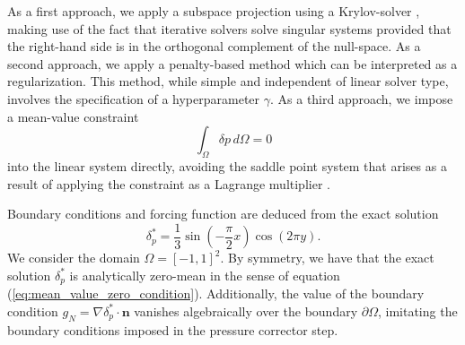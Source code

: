As a first approach, we apply a subspace projection using a Krylov-solver \cite{vorst_iterative_2003}, making use of the fact that iterative solvers solve singular systems provided that the right-hand side is in the orthogonal complement of the null-space.
As a second approach, we apply a penalty-based method which can be interpreted as a regularization.
This method, while simple and independent of linear solver type, involves the specification of a hyperparameter $\gamma$.
As a third approach, we impose a mean-value constraint 
\begin{equation}
  \int_{\Omega}^{} \delta p \,d\Omega = 0
  \label{eq:mean_value_zero_condition}
\end{equation}
into the linear system directly, avoiding the saddle point system that arises as a result of applying the constraint as a Lagrange multiplier \cite{bochev_finite_2005}.


Boundary conditions and forcing function are deduced from the exact solution
\begin{equation}
    \delta_p^* = \frac{1}{3} \sin\left(-\frac{\pi}{2} x \right) \cos\left(2\pi y\right).
\end{equation}
We consider the domain $\Omega = [-1, 1]^2$. By symmetry, we have that the exact solution $\delta_p^*$ is analytically zero-mean in the sense of equation (\ref{eq:mean_value_zero_condition}).
Additionally, the value of the boundary condition $g_N = \nabla \delta_p^* \cdot\bm{n}$ vanishes algebraically over the boundary $\partial \Omega$, imitating the boundary conditions imposed in the pressure corrector step.

